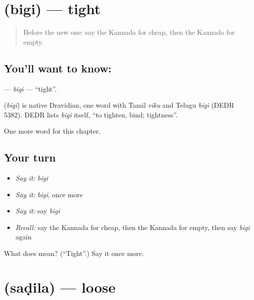 \section[\texorpdfstring{\kn{ಬಿಗಿ} (bigi)}{ಬಿಗಿ (bigi)}]{ (bigi) — tight}

\label{lesson:KA-C217-bigi}



\begin{quote}
Before the new one: say the Kannada for cheap, then the Kannada for empty.
\end{quote}

\subsection*{You'll want to know: }
\textbf{} — \emph{bigi} — \textquotedblleft{}tight\textquotedblright{}.

\begin{cousinweb}
\textbf{} (\emph{bigi}) is native Dravidian, one word with Tamil \emph{viku} and Telugu \emph{bigi} (DEDR 5382). DEDR lists \emph{bigi} itself, \textquotedblleft{}to tighten, bind; tightness\textquotedblright{}.
\end{cousinweb}

\begin{grammarlens}[title={What you've built}]
One more word for this chapter.
\end{grammarlens}

\subsection*{Your turn}
\begin{itemize}
\raggedright
  \item \emph{Say it:} \emph{bigi}
  \item \emph{Say it:} \emph{bigi}, once more
  \item \emph{Say it:} say \emph{bigi}
  \item \emph{Recall:} say the Kannada for cheap, then the Kannada for empty, then say \emph{bigi} again
\end{itemize}

\begin{tcolorbox}[breakable,colback=teal!4,colframe=teal!35!black,title={Before you move on}]
What does  mean? (\textquotedblleft{}Tight\textquotedblright{}.) Say it once more.
\end{tcolorbox}
\section[\texorpdfstring{\kn{ಸಡಿಲ} (saḍila)}{ಸಡಿಲ (saḍila)}]{ (saḍila) — loose}

